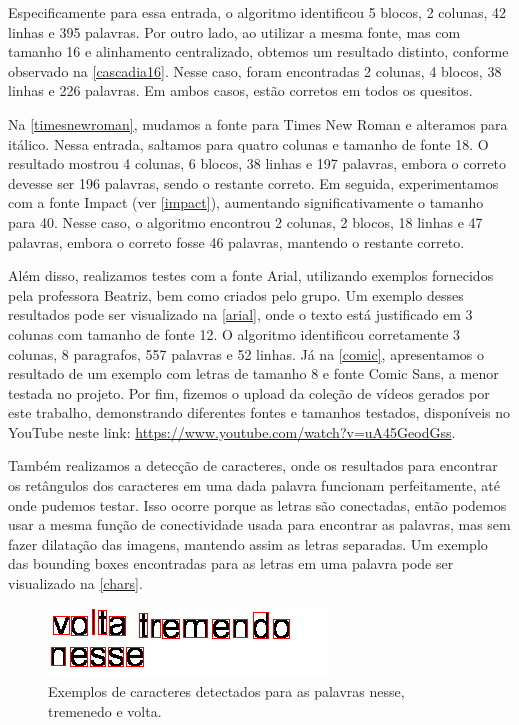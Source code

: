 \documentclass[english, 
               brazil, 
               bsc] %
               {dcomp-abntex2}
\begin{document}
Especificamente para essa entrada, o algoritmo identificou 5 blocos, 2 colunas, 42 linhas e 395 palavras. Por outro lado, ao utilizar a mesma fonte, mas com tamanho 16 e alinhamento centralizado, obtemos um resultado distinto, conforme observado na \autoref{cascadia16}. Nesse caso, foram encontradas 2 colunas, 4 blocos, 38 linhas e 226 palavras. Em ambos casos, estão corretos em todos os quesitos.


Na \autoref{timesnewroman}, mudamos a fonte para Times New Roman e alteramos para itálico. Nessa entrada, saltamos para quatro colunas e tamanho de fonte 18. O resultado mostrou 4 colunas, 6 blocos, 38 linhas e 197 palavras, embora o correto devesse ser 196 palavras, sendo o restante correto. Em seguida, experimentamos com a fonte Impact (ver \autoref{impact}), aumentando significativamente o tamanho para 40. Nesse caso, o algoritmo encontrou 2 colunas, 2 blocos, 18 linhas e 47 palavras, embora o correto fosse 46 palavras, mantendo o restante correto.

Além disso, realizamos testes com a fonte Arial, utilizando exemplos fornecidos pela professora Beatriz, bem como criados pelo grupo. Um exemplo desses resultados pode ser visualizado na \autoref{arial}, onde o texto está justificado em 3 colunas com tamanho de fonte 12. O algoritmo identificou corretamente 3 colunas, 8 paragrafos, 557 palavras e 52 linhas. Já na \autoref{comic}, apresentamos o resultado de um exemplo com letras de tamanho 8 e fonte Comic Sans, a menor testada no projeto. Por fim, fizemos o upload da coleção de vídeos gerados por este trabalho, demonstrando diferentes fontes e tamanhos testados, disponíveis no YouTube neste link: \url{https://www.youtube.com/watch?v=uA45GeodGss}.


Também realizamos a detecção de caracteres, onde os resultados para encontrar os retângulos dos caracteres em uma dada palavra funcionam perfeitamente, até onde pudemos testar. Isso ocorre porque as letras são conectadas, então podemos usar a mesma função de conectividade usada para encontrar as palavras, mas sem fazer dilatação das imagens, mantendo assim as letras separadas. Um exemplo das bounding boxes encontradas para as letras em uma palavra pode ser visualizado na \autoref{chars}.


\begin{figure}[htb]
        \caption{\label{chars} \small Exemplos de caracteres detectados para as palavras nesse, tremenedo e volta. }
        \begin{center}
            \includegraphics[scale=0.55]{./images/ocr.png}
        \end{center}
\end{figure}
\end{document}
